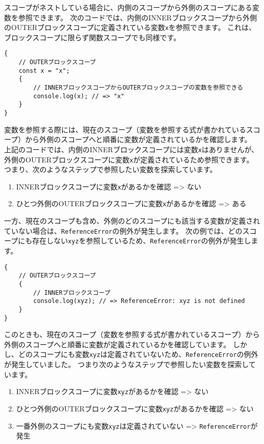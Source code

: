 スコープがネストしている場合に、内側のスコープから外側のスコープにある変数を参照できます。
次のコードでは、内側のINNERブロックスコープから外側のOUTERブロックスコープに定義されている変数\texttt{x}を参照できます。
これは、ブロックスコープに限らず関数スコープでも同様です。

\begin{lstlisting}
{
    // OUTERブロックスコープ
    const x = "x";
    {
        // INNERブロックスコープからOUTERブロックスコープの変数を参照できる
        console.log(x); // => "x"
    }
}
\end{lstlisting}

変数を参照する際には、現在のスコープ（変数を参照する式が書かれているスコープ）から外側のスコープへと順番に変数が定義されているかを確認します。
上記のコードでは、内側のINNERブロックスコープには変数\texttt{x}はありませんが、外側のOUTERブロックスコープに変数\texttt{x}が定義されているため参照できます。
つまり、次のようなステップで参照したい変数を探索しています。

\begin{enumerate}
\def\labelenumi{\arabic{enumi}.}
\item
  INNERブロックスコープに変数\texttt{x}があるかを確認
  =\textgreater{} ない
\item
  ひとつ外側のOUTERブロックスコープに変数\texttt{x}があるかを確認
  =\textgreater{} ある
\end{enumerate}

一方、現在のスコープも含め、外側のどのスコープにも該当する変数が定義されていない場合は、\texttt{ReferenceError}の例外が発生します。
次の例では、どのスコープにも存在しない\texttt{xyz}を参照しているため、\texttt{ReferenceError}の例外が発生します。

\begin{lstlisting}
{
    // OUTERブロックスコープ
    {
        // INNERブロックスコープ
        console.log(xyz); // => ReferenceError: xyz is not defined
    }
}
\end{lstlisting}

このときも、現在のスコープ（変数を参照する式が書かれているスコープ）から外側のスコープへと順番に変数が定義されているかを確認しています。
しかし、どのスコープにも変数\texttt{xyz}は定義されていないため、\texttt{ReferenceError}の例外が発生していました。
つまり次のようなステップで参照したい変数を探索しています。

\begin{enumerate}
\def\labelenumi{\arabic{enumi}.}
\item
  INNERブロックスコープに変数\texttt{xyz}があるかを確認
  =\textgreater{} ない
\item
  ひとつ外側のOUTERブロックスコープに変数\texttt{xyz}があるかを確認
  =\textgreater{} ない
\item
  一番外側のスコープにも変数\texttt{xyz}は定義されていない
  =\textgreater{} \texttt{ReferenceError}が発生
\end{enumerate}

